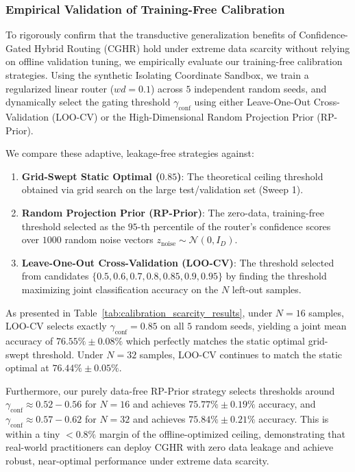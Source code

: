 \documentclass{article}
\theoremstyle{plain}
\theoremstyle{definition}
\theoremstyle{remark}
\begin{document}
\subsubsection{Empirical Validation of Training-Free Calibration}
To rigorously confirm that the transductive generalization benefits of Confidence-Gated Hybrid Routing (CGHR) hold under extreme data scarcity without relying on offline validation tuning, we empirically evaluate our training-free calibration strategies. Using the synthetic Isolating Coordinate Sandbox, we train a regularized linear router ($wd=0.1$) across $5$ independent random seeds, and dynamically select the gating threshold $\gamma_{\text{conf}}$ using either Leave-One-Out Cross-Validation (LOO-CV) or the High-Dimensional Random Projection Prior (RP-Prior).

We compare these adaptive, leakage-free strategies against:
\begin{enumerate}
    \item \textbf{Grid-Swept Static Optimal ($0.85$)}: The theoretical ceiling threshold obtained via grid search on the large test/validation set (Sweep 1).
    \item \textbf{Random Projection Prior (RP-Prior)}: The zero-data, training-free threshold selected as the $95$-th percentile of the router's confidence scores over $1000$ random noise vectors $z_{\text{noise}} \sim \mathcal{N}(0, I_D)$.
    \item \textbf{Leave-One-Out Cross-Validation (LOO-CV)}: The threshold selected from candidates $\{0.5, 0.6, 0.7, 0.8, 0.85, 0.9, 0.95\}$ by finding the threshold maximizing joint classification accuracy on the $N$ left-out samples.
\end{enumerate}

As presented in Table~\ref{tab:calibration_scarcity_results}, under $N=16$ samples, LOO-CV selects exactly $\gamma_{\text{conf}} = 0.85$ on all $5$ random seeds, yielding a joint mean accuracy of $76.55\% \pm 0.08\%$ which perfectly matches the static optimal grid-swept threshold. Under $N=32$ samples, LOO-CV continues to match the static optimal at $76.44\% \pm 0.05\%$. 

Furthermore, our purely data-free RP-Prior strategy selects thresholds around $\gamma_{\text{conf}} \approx 0.52 - 0.56$ for $N=16$ and achieves $75.77\% \pm 0.19\%$ accuracy, and $\gamma_{\text{conf}} \approx 0.57 - 0.62$ for $N=32$ and achieves $75.84\% \pm 0.21\%$ accuracy. This is within a tiny $<0.8\%$ margin of the offline-optimized ceiling, demonstrating that real-world practitioners can deploy CGHR with zero data leakage and achieve robust, near-optimal performance under extreme data scarcity.
\end{document}
